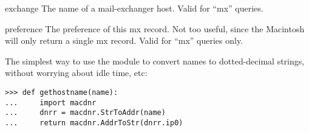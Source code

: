 \begin{memberdesc}{exchange}
The name of a mail-exchanger host.  Valid for ``mx'' queries.
\end{memberdesc}

\begin{memberdesc}{preference}
The preference of this mx record.  Not too useful, since the Macintosh
will only return a single mx record.  Valid for ``mx'' queries only.
\end{memberdesc}

The simplest way to use the module to convert names to dotted-decimal
strings, without worrying about idle time, etc:

\begin{verbatim}
>>> def gethostname(name):
...     import macdnr
...     dnrr = macdnr.StrToAddr(name)
...     return macdnr.AddrToStr(dnrr.ip0)
\end{verbatim}
